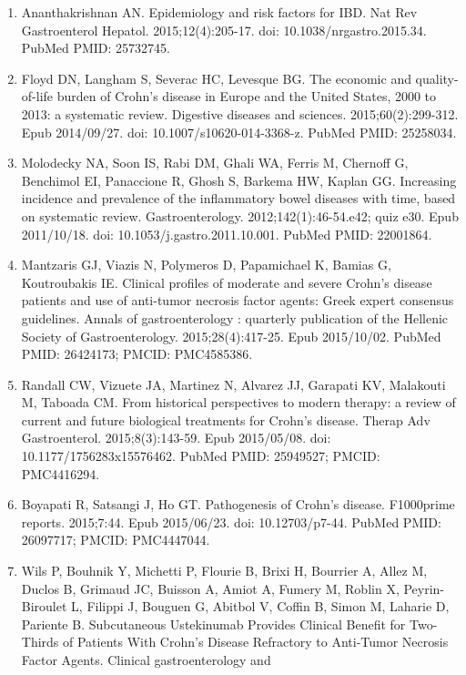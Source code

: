 \documentclass[11pt,]{article}
\providecommand{\tightlist}{%
  \setlength{\itemsep}{0pt}\setlength{\parskip}{0pt}}
\begin{document}
\begin{enumerate}
\def\labelenumi{\arabic{enumi}.}
\tightlist
\item
  Ananthakrishnan AN. Epidemiology and risk factors for IBD. Nat Rev
  Gastroenterol Hepatol. 2015;12(4):205-17. doi:
  10.1038/nrgastro.2015.34. PubMed PMID: 25732745.
\item
  Floyd DN, Langham S, Severac HC, Levesque BG. The economic and
  quality-of-life burden of Crohn's disease in Europe and the United
  States, 2000 to 2013: a systematic review. Digestive diseases and
  sciences. 2015;60(2):299-312. Epub 2014/09/27. doi:
  10.1007/s10620-014-3368-z. PubMed PMID: 25258034.
\item
  Molodecky NA, Soon IS, Rabi DM, Ghali WA, Ferris M, Chernoff G,
  Benchimol EI, Panaccione R, Ghosh S, Barkema HW, Kaplan GG. Increasing
  incidence and prevalence of the inflammatory bowel diseases with time,
  based on systematic review. Gastroenterology. 2012;142(1):46-54.e42;
  quiz e30. Epub 2011/10/18. doi: 10.1053/j.gastro.2011.10.001. PubMed
  PMID: 22001864.
\item
  Mantzaris GJ, Viazis N, Polymeros D, Papamichael K, Bamias G,
  Koutroubakis IE. Clinical profiles of moderate and severe Crohn's
  disease patients and use of anti-tumor necrosis factor agents: Greek
  expert consensus guidelines. Annals of gastroenterology : quarterly
  publication of the Hellenic Society of Gastroenterology.
  2015;28(4):417-25. Epub 2015/10/02. PubMed PMID: 26424173; PMCID:
  PMC4585386.
\item
  Randall CW, Vizuete JA, Martinez N, Alvarez JJ, Garapati KV, Malakouti
  M, Taboada CM. From historical perspectives to modern therapy: a
  review of current and future biological treatments for Crohn's
  disease. Therap Adv Gastroenterol. 2015;8(3):143-59. Epub 2015/05/08.
  doi: 10.1177/1756283x15576462. PubMed PMID: 25949527; PMCID:
  PMC4416294.
\item
  Boyapati R, Satsangi J, Ho GT. Pathogenesis of Crohn's disease.
  F1000prime reports. 2015;7:44. Epub 2015/06/23. doi: 10.12703/p7-44.
  PubMed PMID: 26097717; PMCID: PMC4447044.
\item
  Wils P, Bouhnik Y, Michetti P, Flourie B, Brixi H, Bourrier A, Allez
  M, Duclos B, Grimaud JC, Buisson A, Amiot A, Fumery M, Roblin X,
  Peyrin-Biroulet L, Filippi J, Bouguen G, Abitbol V, Coffin B, Simon M,
  Laharie D, Pariente B. Subcutaneous Ustekinumab Provides Clinical
  Benefit for Two-Thirds of Patients With Crohn's Disease Refractory to
  Anti-Tumor Necrosis Factor Agents. Clinical gastroenterology and

\end{enumerate}
\end{document}
